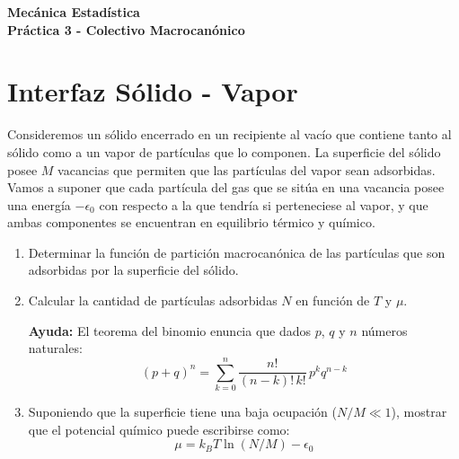 \documentclass[a4paper,11pt]{article}
\begin{document}
\pagestyle{fancy}
\chead{\small \the\year}



\thispagestyle{plain}
\begin{center}
    \textbf{\large
        Mecánica Estadística \\
        Práctica 3 - Colectivo Macrocanónico
    }
\end{center}
\vspace{-1.5em}




\section{Interfaz Sólido - Vapor}

Consideremos un sólido encerrado en un recipiente al vacío que 
contiene tanto al sólido como a un vapor de partículas que lo componen.
La superficie del sólido posee $M$ vacancias que permiten que las 
partículas del vapor sean adsorbidas. Vamos a suponer que cada 
partícula del gas que se sitúa en una vacancia posee una energía 
$-\epsilon_0$ con respecto a la que tendría si perteneciese al vapor, 
y que ambas componentes se encuentran en equilibrio 
térmico y químico.

\begin{enumerate}[label=(\alph*),
                  leftmargin=2\parindent,
                  rightmargin=2\parindent]

    \item{Determinar la función de partición macrocanónica de las 
          partículas que son adsorbidas por la superficie del sólido.}

    \item{Calcular la cantidad de partículas adsorbidas $N$ en función de 
          $T$ y $\mu$.}
          
    {\small
    \textbf{Ayuda:}
    El teorema del binomio enuncia que dados $p$, $q$ y $n$ números 
    naturales:
    $$ (p + q)^n = \sum_{k=0}^n \frac{n!}{(n-k)! \, k!} \, p^k q^{n-k} $$
    }
    
    \item{Suponiendo que la superficie tiene una baja ocupación ($N/M 
          \ll 1$), mostrar que el potencial químico puede escribirse 
          como:
          $$ \mu = k_B T \ln(N/M) - \epsilon_0 $$
          }

\end{enumerate}
\end{document}
